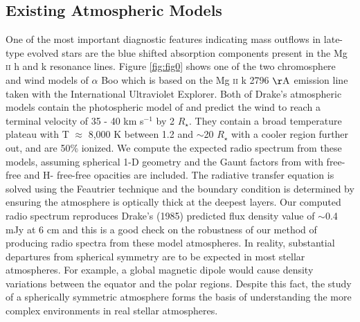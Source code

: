 \documentclass[iop]{emulateapj}
\begin{document}
\subsection{Existing Atmospheric Models} \label{disc2}
One of the most important diagnostic features indicating mass outflows in late-type evolved stars are the blue shifted absorption components present in the Mg {\textsc{ii}} h and k resonance lines. Figure \ref{fig:fig0} shows one of the two chromosphere and wind models of $\alpha$ Boo \citep{1985pssl.proc..351D} which is based on the Mg {\textsc{ii}} k 2796 $\rm{\AA}$ emission line taken with the International Ultraviolet Explorer. Both of Drake's atmospheric models contain the photospheric model of \cite{1975ApJ...200..660A} and predict the wind to reach a terminal velocity of 35 - 40 km s${}^{-1}$ by 2 $R _{\star}$. They contain a broad temperature plateau with T $\approx$ 8,000 K between 1.2 and $\sim$20 $R _{\star}$ with a cooler region further out, and are 50\% ionized. We compute the expected radio spectrum from these models, assuming spherical 1-D geometry and the Gaunt factors from \cite{1988ApJ...327..477H} with free-free and H- free-free opacities are included. The radiative transfer equation is solved using the Feautrier technique \cite[see, e.g.,][]{1994MNRAS.268..894H} and the boundary condition is determined by ensuring the atmosphere is optically thick at the deepest layers. Our computed radio spectrum reproduces Drake's (1985) predicted flux density value of $\sim$0.4 mJy at 6 cm and this is a good check on the robustness of our method of producing radio spectra from these model atmospheres. In reality, substantial departures from spherical symmetry are to be expected in most stellar atmospheres. For example, a global magnetic dipole would cause density variations between the equator and the polar regions. Despite this fact, the study of a  spherically symmetric atmosphere forms the basis of understanding the more complex environments in real stellar atmospheres.
\end{document}
